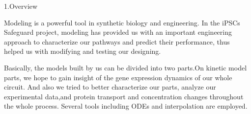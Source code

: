 \documentclass[UTF8]{ctexart}%
\begin{document}
	\begin{center}
		{\Large 1.Overview} 
	\end{center}
   Modeling is a powerful tool in synthetic biology and engineering. In the iPSCs Safeguard project, modeling has provided us with an important engineering approach to characterize our pathways and predict their performance, thus helped us with modifying and testing our designing.
	
	Basically, the models built by us can be divided into two parts.On kinetic model parts, we hope to gain insight of the gene expression dynamics of our whole circuit. And also we tried to better characterize our parts, analyze our experimental data,and protein transport and concentration changes throughout the whole process. Several tools including ODEs and interpolation are employed.
	
\end{document}

